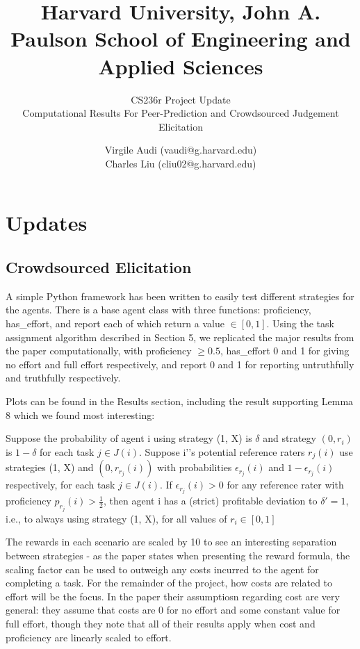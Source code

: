 \documentclass{scrartcl}
\title{Harvard University, John A. Paulson School of Engineering and Applied Sciences \newline}
\subtitle{CS236r Project Update\\ Computational Results For Peer-Prediction and Crowdsourced Judgement Elicitation}
\author{Virgile Audi (vaudi@g.harvard.edu)\\
		Charles Liu (cliu02@g.harvard.edu)}
\begin{document}
 
\maketitle
	  
\section{Updates}
\subsection{Crowdsourced Elicitation}
A simple Python framework has been written to easily test different strategies for the agents. There is a base agent class with three functions: proficiency, has\_effort, and report each of which return a value $\in [0,1]$. Using the task assignment algorithm described in Section 5, we replicated the major results from the paper computationally, with proficiency $\geq 0.5$, has\_effort 0 and 1 for giving no effort and full effort respectively, and report 0 and 1 for reporting untruthfully and truthfully respectively.

Plots can be found in the Results section, including the result supporting Lemma 8 which we found most interesting: 
\begin{displayquote}
Suppose the probability of agent i using strategy (1, X) is $\delta$ and strategy $(0, r_i)$ is $1-\delta$ for each task $j \in J(i)$. Suppose i'’s potential reference raters $r_j (i)$ use strategies (1, X) and $(0, r_{r_j} (i))$ with probabilities $\epsilon_{r_j}(i)$ and $1-\epsilon_{r_j}(i)$ respectively, for each task $j \in J(i)$. If $\epsilon_{r_j}(i) > 0$ for any reference rater with proficiency $p_{r_j} (i) > \frac{1}{2}$, then agent i has a (strict) profitable deviation to $\delta'=1$, i.e., to always using strategy (1, X), for all values of $r_i \in [0,1]$
\end{displayquote}

The rewards in each scenario are scaled by 10 to see an interesting separation between strategies - as the paper states when presenting the reward formula, the scaling factor can be used to outweigh any costs incurred to the agent for completing a task. For the remainder of the project, how costs are related to effort will be the focus. In the paper their assumptiosn regarding cost are very general: they assume that costs are 0 for no effort and some constant value for full effort, though they note that all of their results apply when cost and proficiency are linearly scaled to effort. 
\end{document}
